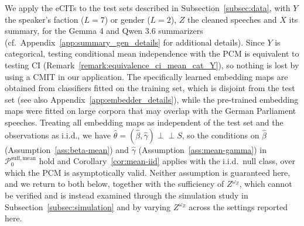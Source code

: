 \documentclass[twoside,11pt]{article}
\newcommand{\indep}{\perp \!\!\! \perp}
\begin{document}
We apply the eCITs to the test sets described in Subsection~\ref{subsec:data}, with $Y$ the speaker's faction ($L = 7$) or gender ($L = 2$), $Z$ the cleaned speeches and $X$ its summary, for the Gemma 4 and Qwen 3.6 summarizers (cf.\ Appendix~\ref{app:summary_gen_details} for additional details). 
Since $Y$ is categorical, testing conditional mean independence with the PCM is equivalent to testing CI (Remark~\ref{remark:equivalence_ci_mean_cat_Y}), so nothing is lost by using a CMIT in our application. 
The specifically learned embedding maps are obtained from classifiers fitted on the training set, which is disjoint from the test set (see also Appendix~\ref{app:embedder_details}), while the pre-trained embedding maps were fitted on large corpora that may overlap with the German Parliament speeches. 
Treating all embedding maps as independent of the test set and the observations as i.i.d., we have $\hat\theta = (\hat\beta,\hat\gamma) \indep S$, so the conditions on $\hat\beta$ (Assumption~\ref{ass:beta-mean}) and $\hat\gamma$ (Assumption~\ref{ass:mean-gamma}) in $\mathcal{P}_0^{\mathrm{suff, mean}}$ hold and Corollary~\ref{cor:mean-iid} applies with the i.i.d.\ null class, over which the PCM is asymptotically valid. 
Neither assumption is guaranteed here, and we return to both below, together with the sufficiency of $Z^{\omega_Z}$, which cannot be verified and is instead examined through the simulation study in Subsection~\ref{subsec:simulation} and by varying $Z^{\omega_Z}$ across the settings reported here.
\end{document}
